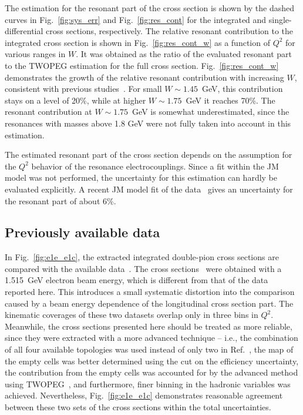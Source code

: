\documentclass[prc,twocolumn,superscriptaddress,showpacs,amssymb,amsmath,amsfonts,aps,nofootinbib]{revtex4-1}
\begin{document}
The estimation for the resonant part of the cross section is shown by the dashed curves in Fig.~\ref{fig:sys_err} and Fig.~\ref{fig:res_cont} for the integrated and single-differential cross sections, respectively. The relative resonant contribution to the integrated cross section is shown in Fig.~\ref{fig:res_cont_w} as a function of $Q^{2}$ for various ranges in $W$. It was obtained as the ratio of the evaluated resonant part to the TWOPEG estimation for the full cross section. Fig.~\ref{fig:res_cont_w} demonstrates the growth of the relative resonant contribution with increasing $W$, consistent with previous studies~\cite{Mokeev:2008iw,Mokeev:2015lda}. For small $W \sim 1.45$~GeV, this contribution stays on a level of 20\%, while at higher $W \sim 1.75$~GeV it reaches 70\%. The resonant contribution at $W \sim 1.75$~GeV is somewhat underestimated, since the resonances with masses above 1.8 GeV were not fully taken into account in this estimation.

The estimated resonant part of the cross section depends on the assumption for the $Q^{2}$ behavior of the resonance electrocouplings. Since a fit within the JM model was not performed, the uncertainty for this estimation can hardly be evaluated explicitly. A recent JM model fit of the data~\cite{Isupov:2017lnd} gives an uncertainty for the resonant part of about 6\%.












\subsection{Previously available data}
\label{prev_data}



In Fig.~\ref{fig:e1e_e1c}, the extracted integrated double-pion cross sections  are compared with the available data~\cite{Fedotov:2008aa}. 
The cross sections~\cite{Fedotov:2008aa} were obtained with a 1.515~GeV electron beam energy, which is different from that of the data reported here.
This introduces a small systematic distortion into the comparison
 caused by a beam energy dependence of the longitudinal cross section part. The kinematic coverages of these two datasets overlap only in three bins in $Q^{2}$. Meanwhile, the cross sections presented here should be treated as more reliable, since they were extracted with a more advanced technique -- i.e., the combination of all four available topologies was used instead of only two in Ref.~\cite{Fedotov:2008aa}, the map of the empty cells was better determined using  the cut on the efficiency uncertainty, the contribution from the empty cells was accounted for by the advanced method using TWOPEG~\cite{Skorodum:EG}, and furthermore, finer binning in the hadronic variables was achieved. Nevertheless, Fig.~\ref{fig:e1e_e1c} demonstrates reasonable agreement between these two sets of the cross sections within the total uncertainties.  
\end{document}
